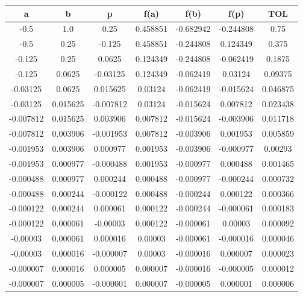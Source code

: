 \documentclass[12pt]{article}
\begin{document}
\begin{enumerate}
\begin{enumerate}[label=\alph*]
        \begin{tabular}{|c|c|c|c|c|c|c|}
            \hline
            \textbf{a} & \textbf{b} & \textbf{p} & \textbf{f(a)} & \textbf{f(b)} & \textbf{f(p)} & \textbf{TOL}\\ \hline
            -0.5 & 1.0 & 0.25 & 0.458851 & -0.682942 & -0.244808 & 0.75 \\
            -0.5 & 0.25 & -0.125 & 0.458851 & -0.244808 & 0.124349 & 0.375 \\
            -0.125 & 0.25 & 0.0625 & 0.124349 & -0.244808 & -0.062419 & 0.1875 \\
            -0.125 & 0.0625 & -0.03125 & 0.124349 & -0.062419 & 0.03124 & 0.09375 \\
            -0.03125 & 0.0625 & 0.015625 & 0.03124 & -0.062419 & -0.015624 & 0.046875 \\
            -0.03125 & 0.015625 & -0.007812 & 0.03124 & -0.015624 & 0.007812 & 0.023438 \\
            -0.007812 & 0.015625 & 0.003906 & 0.007812 & -0.015624 & -0.003906 & 0.011718 \\
            -0.007812 & 0.003906 & -0.001953 & 0.007812 & -0.003906 & 0.001953 & 0.005859 \\
            -0.001953 & 0.003906 & 0.000977 & 0.001953 & -0.003906 & -0.000977 & 0.00293 \\
            -0.001953 & 0.000977 & -0.000488 & 0.001953 & -0.000977 & 0.000488 & 0.001465 \\
            -0.000488 & 0.000977 & 0.000244 & 0.000488 & -0.000977 & -0.000244 & 0.000732 \\
            -0.000488 & 0.000244 & -0.000122 & 0.000488 & -0.000244 & 0.000122 & 0.000366 \\
            -0.000122 & 0.000244 & 0.000061 & 0.000122 & -0.000244 & -0.000061 & 0.000183 \\
            -0.000122 & 0.000061 & -0.00003 & 0.000122 & -0.000061 & 0.00003 & 0.000092 \\
            -0.00003 & 0.000061 & 0.000016 & 0.00003 & -0.000061 & -0.000016 & 0.000046 \\
            -0.00003& 0.000016 & -0.000007 & 0.00003 & -0.000016 & 0.000007 & 0.000023 \\
            -0.000007 & 0.000016 & 0.000005 & 0.000007 & -0.000016 & -0.000005 & 0.000012 \\
            -0.000007 & 0.000005 & -0.000001 & 0.000007 & -0.000005 & 0.000001 & 0.000006 \\
            \hline
        \end{tabular}


\end{enumerate}
\end{enumerate}
\end{document}
